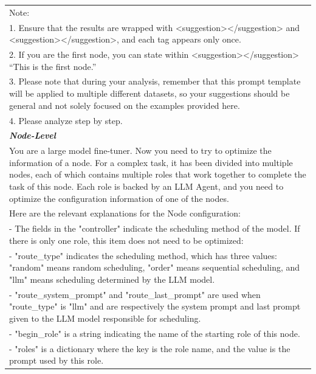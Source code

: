 \documentclass{article}
\begin{document}
\begin{table}[htbp]
{\begin{tabular}{p{15cm}}
Note:\\
1. Ensure that the results are wrapped with <suggestion></suggestion> and <suggestion></suggestion>, and each tag appears only once.\\
2. If you are the first node, you can state within <suggestion></suggestion> “This is the first node.”\\
3. Please note that during your analysis, remember that this prompt template will be applied to multiple different datasets, so your suggestions should be general and not solely focused on the examples provided here.\\
4. Please analyze step by step.\\
    \midrule
    \rowcolor{light-gray}
    \textbf{\textit{Node-Level}} \\
    You are a large model fine-tuner. Now you need to try to optimize the information of a node. For a complex task, it has been divided into multiple nodes, each of which contains multiple roles that work together to complete the task of this node. Each role is backed by an LLM Agent, and you need to optimize the configuration information of one of the nodes.\par\\

Here are the relevant explanations for the Node configuration:\\
 - The fields in the "controller" indicate the scheduling method of the model. If there is only one role, this item does not need to be optimized:\\
   - "route\_type" indicates the scheduling method, which has three values: "random" means random scheduling, "order" means sequential scheduling, and "llm" means scheduling determined by the LLM model.\\
   - "route\_system\_prompt" and "route\_last\_prompt" are used when "route\_type" is "llm" and are respectively the system prompt and last prompt given to the LLM model responsible for scheduling.\\
 - "begin\_role" is a string indicating the name of the starting role of this node.\\
 - "roles" is a dictionary where the key is the role name, and the value is the prompt used by this role.\par\\


\end{tabular}}
\end{table}
\end{document}
